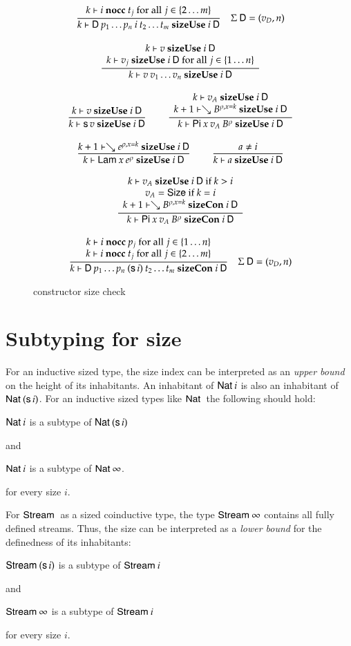 \begin{figure}[htp]
\begin{gather*}
\ \dfrac{k\vdash i\mbox{ \textbf{nocc} }t_j \mbox { for all } j \in \{ 2 \ldots m\}}{k\vdash\mathsf{D} \: p_1 \ldots p_n \: i \: t_2 \ldots t_m\mbox{ \textbf{sizeUse} }i\:\mathsf{D}}
{\quad \Sigma \: \mathsf{D} = (v_D,n)}
\\[2ex]
\ \dfrac{\begin{array}[b]{c}k\vdash v\mbox{ \textbf{sizeUse} }i\:\mathsf{D}\\k\vdash v_j\mbox{ \textbf{sizeUse} }i\:\mathsf{D} \mbox { for all } j \in \{ 1 \ldots n\}\end{array}}{k\vdash v \: v_1 \ldots v_n\mbox{ \textbf{sizeUse} }i\:\mathsf{D}}
\\[2ex]
\ \dfrac{k\vdash v\mbox{ \textbf{sizeUse} }i\:\mathsf{D}}{k\vdash\mathsf{s}\, v\mbox{ \textbf{sizeUse} }i\:\mathsf{D}}
\qquad
\ \dfrac{\begin{array}[b]{c}k\vdash v_A\mbox{ \textbf{sizeUse} }i\:\mathsf{D}\\k+1\vdash\searrow B^{\rho,x=k}\mbox{ \textbf{sizeUse} }i\:\mathsf{D}\end{array}}{k\vdash\mathsf{Pi} \: x \: v_A \: B^{\rho}\mbox{ \textbf{sizeUse} }i\:\mathsf{D}}
\\[2ex]
\ \dfrac{k+1\vdash\searrow e^{\rho,x=k}\mbox{ \textbf{sizeUse} }i\:\mathsf{D}}{k\vdash\mathsf{Lam} \: x \: e^{\rho}\mbox{ \textbf{sizeUse} }i\:\mathsf{D}}
\qquad
\ \dfrac{a \neq i}{k\vdash a\mbox{ \textbf{sizeUse} }i\:\mathsf{D}}
\\[2ex]
\ \dfrac{\begin{array}[b]{c}k\vdash v_A\mbox{ \textbf{sizeUse} }i\:\mathsf{D} \mbox{ if } k > i\\v_A = \mathsf{Size} \mbox { if } k = i \\k+1\vdash\searrow B^{\rho,x=k}\mbox{ \textbf{sizeCon} }i\:\mathsf{D}\end{array}}{k\vdash\mathsf{Pi} \: x \: v_A \: B^{\rho}\mbox{ \textbf{sizeCon} }i\:\mathsf{D}}
\\[2ex]
\ \dfrac{\begin{array}[b]{c}k\vdash i\mbox{ \textbf{nocc} }p_j \mbox { for all } j \in \{ 1 \ldots n\}\\k\vdash i\mbox{ \textbf{nocc} }t_j \mbox { for all } j \in \{ 2 \ldots m\}\end{array}}{k\vdash\mathsf{D} \:p_1 \ldots p_n \: (\mathsf{s}\, i) \:t_2 \ldots t_m\mbox{ \textbf{sizeCon} }i\:\mathsf{D}}
{\quad \Sigma \: \mathsf{D} = (v_D,n)}
\end{gather*}
\caption{constructor size check}
\label{fsizecon}
\end{figure}


\section{Subtyping for size}

For an inductive sized type, the size index can be interpreted as an \emph{upper bound} on the height of its inhabitants.
An inhabitant of $\mathsf{Nat}\: i$ is also an inhabitant of $\mathsf{Nat}\: (\mathsf{s}\, i)$. For an inductive sized types like $\mathsf{Nat}\:$ the following should hold:
\begin{bsp}
$\mathsf{Nat}\: i$ is a subtype of $\mathsf{Nat}\: (\mathsf{s}\, i)$  
\end{bsp}
and
\begin{bsp}
$\mathsf{Nat}\: i$ is a subtype of $\mathsf{Nat}\: \infty$.
\end{bsp}
for every size $i$.

For $\mathsf{Stream}\:$ as a sized coinductive type, the type $\mathsf{Stream}\: \infty$ contains all fully defined streams.
Thus, the size can be interpreted as a \emph{lower bound} for the definedness of its inhabitants:
\begin{bsp}
$\mathsf{Stream}\: (\mathsf{s}\, i) $ is a subtype of $\mathsf{Stream}\: i$
\end{bsp}
and
\begin{bsp}
$\mathsf{Stream}\: \infty$ is a subtype of $\mathsf{Stream}\: i$
\end{bsp}
for every size $i$.



